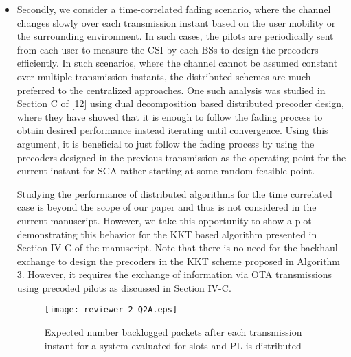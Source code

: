 \begin{enumerate}
\begin{itemize}
\item Secondly, we consider a time-correlated fading scenario, where the channel changes slowly over each transmission instant based on the user mobility or the surrounding environment. In such cases, the pilots are periodically sent from each user to measure the \ac{CSI} by each \acp{BS} to design the precoders efficiently. In such scenarios, where the channel cannot be assumed constant over multiple transmission instants, the distributed schemes are much preferred to the centralized approaches. One such analysis was studied in Section C of [12] using dual decomposition based distributed precoder design, where they have showed that it is enough to follow the fading process to obtain desired performance instead iterating until convergence. Using this argument, it is beneficial to just follow the fading process by using the precoders designed in the previous transmission as the operating point for the current instant for \ac{SCA} rather starting at some random feasible point. 

Studying the performance of distributed algorithms for the time correlated case is beyond the scope of our paper and thus is not considered in the current manuscript. However, we take this opportunity to show a plot demonstrating this behavior for the \ac{KKT} based algorithm presented in Section IV-C of the manuscript. Note that there is no need for the backhaul exchange to design the precoders in the \ac{KKT} scheme proposed in Algorithm 3. However, it requires the exchange of information via \ac{OTA} transmissions using precoded pilots as discussed in Section IV-C.
\begin{figure}[h!]
	\centering
	\texttt{[image: reviewer\_2\_Q2A.eps]}
	\caption{Expected number backlogged packets after each transmission instant for a system  evaluated for  slots and \ac{PL} is distributed }
	\label{fig-review-2}
\end{figure}


\end{itemize}
\end{enumerate}
